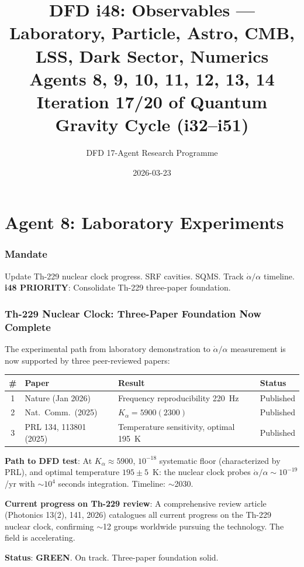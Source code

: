 \documentclass[11pt,a4paper]{article}
\title{DFD i48: Observables --- Laboratory, Particle, Astro, CMB, LSS, Dark Sector, Numerics\\[6pt]
\large Agents 8, 9, 10, 11, 12, 13, 14\\[6pt]
\normalsize Iteration 17/20 of Quantum Gravity Cycle (i32--i51)}
\author{DFD 17-Agent Research Programme}
\date{2026-03-23}
\newcommand{\GREEN}{\textcolor{dfdgreen}{\textbf{GREEN}}}
\begin{document}
\maketitle
\tableofcontents
\newpage

\part{Agent 8: Laboratory Experiments}
\label{part:agent8}

\section{Mandate}

Update Th-229 nuclear clock progress. SRF cavities. SQMS. Track $\dot{\alpha}/\alpha$ timeline. \textbf{i48 PRIORITY}: Consolidate Th-229 three-paper foundation.

\section{Th-229 Nuclear Clock: Three-Paper Foundation Now Complete}

\begin{tcolorbox}[colback=green!5!white, colframe=green!60!black,
  title={Th-229 Three-Paper Foundation: Complete Experimental Path to $\dot{\alpha}/\alpha$}]

The experimental path from laboratory demonstration to $\dot{\alpha}/\alpha$ measurement is now supported by three peer-reviewed papers:

\begin{center}
\begin{tabular}{clll}
\toprule
\textbf{\#} & \textbf{Paper} & \textbf{Result} & \textbf{Status} \\
\midrule
1 & Nature (Jan 2026) & Frequency reproducibility 220~Hz & Published \\
2 & Nat.\ Comm.\ (2025) & $K_\alpha = 5900(2300)$ & Published \\
3 & PRL 134, 113801 (2025) & Temperature sensitivity, optimal 195~K & Published \\
\bottomrule
\end{tabular}
\end{center}

\textbf{Path to DFD test}: At $K_\alpha \approx 5900$, $10^{-18}$ systematic floor (characterized by PRL), and optimal temperature $195 \pm 5$~K: the nuclear clock probes $\dot{\alpha}/\alpha \sim 10^{-19}$/yr with $\sim 10^4$ seconds integration. Timeline: $\sim$2030.

\textbf{Current progress on Th-229 review}: A comprehensive review article (Photonics 13(2), 141, 2026) catalogues all current progress on the Th-229 nuclear clock, confirming $\sim$12 groups worldwide pursuing the technology. The field is accelerating.

\textbf{Status}: \GREEN. On track. Three-paper foundation solid.
\end{tcolorbox}
\end{document}
